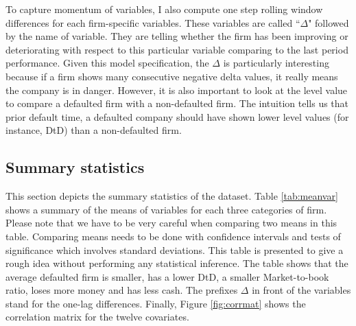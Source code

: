 To capture momentum of variables, I also compute one step rolling window differences for each firm-specific variables. These variables are called ``$\Delta$" followed by the name of variable. They are telling whether the firm has been improving or deteriorating with respect to this particular variable comparing to the last period performance. Given this model specification, the $\Delta$ is particularly interesting because if a firm shows many consecutive negative delta values, it really means the company is in danger. However, it is also important to look at the level value to compare a defaulted firm with a non-defaulted firm. The intuition tells us that prior default time, a defaulted company should have shown lower level values (for instance, DtD) than a non-defaulted firm.


\subsection{Summary statistics}
\label{sec3-2}


This section depicts the summary statistics of the dataset. Table \ref{tab:meanvar} shows a summary of the means of variables for each three categories of firm. Please note that we have to be very careful when comparing two means in this table. Comparing means needs to be done with confidence intervals and tests of significance which involves standard deviations. This table is presented to give a rough idea without performing any statistical inference. The table shows that the average defaulted firm is smaller, has a lower DtD, a smaller Market-to-book ratio, loses more money and has less cash. The prefixes $\Delta$ in front of the variables stand for the one-lag differences. Finally, Figure \ref{fig:corrmat} shows the correlation matrix for the twelve covariates.

